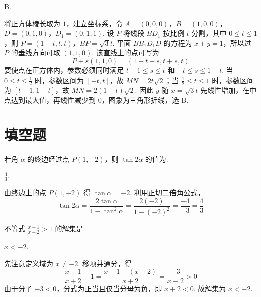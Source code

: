\begin{answer}
B.
\end{answer}

\begin{solution}
将正方体棱长取为 \(1\)，建立坐标系，令 \(A=(0,0,0)\)，\(B=(1,0,0)\)，\(D=(0,1,0)\)，\(D_1=(0,1,1)\).
设 \(P\) 将线段 \(BD_1\) 按比例 \(t\) 分割，其中 \(0\leqslant t\leqslant1\)，则
\(P=(1-t,t,t)\)，\(BP=\sqrt3t\).
平面 \(BB_1D_1D\) 的方程为 \(x+y=1\)，所以过 \(P\) 的垂线方向可取 \((1,1,0)\). 该直线上的点可写为
\[
P+s(1,1,0)=(1-t+s,t+s,t)
\]
要使点在正方体内，参数必须同时满足 \(t-1\leqslant s\leqslant t\) 和 \(-t\leqslant s\leqslant1-t\).
当 \(0\leqslant t\leqslant\frac12\) 时，参数区间为 \([-t,t]\)，故
\(MN=2t\sqrt2\)；当 \(\frac12\leqslant t\leqslant1\) 时，参数区间为 \([t-1,1-t]\)，故
\(MN=2(1-t)\sqrt2\). 因此 \(y\) 随 \(x=\sqrt3t\) 先线性增加，在中点达到最大值，再线性减少到 \(0\)，图象为三角形折线，选 B.
\end{solution}

\section{填空题}

\begin{problem}
若角 \(\alpha\) 的终边经过点 \(P(1, -2)\)，则 \(\tan 2\alpha\) 的值为\fillinblank{}.
\end{problem}

\begin{answer}
\(\frac{4}{3}\).
\end{answer}

\begin{solution}
由终边上的点 \(P(1,-2)\) 得 \(\tan\alpha=-2\). 利用正切二倍角公式，
\[
\tan2\alpha=\frac{2\tan\alpha}{1-\tan^2\alpha}
 =\frac{2(-2)}{1-(-2)^2}=\frac{-4}{-3}=\frac43
\]
\end{solution}

\begin{problem}
不等式 \(\frac{x - 1}{x + 2} > 1\) 的解集是\fillinblank{}.
\end{problem}

\begin{answer}
\(x < -2\).
\end{answer}

\begin{solution}
先注意定义域为 \(x\ne-2\). 移项并通分，得
\[
\frac{x-1}{x+2}-1=\frac{x-1-(x+2)}{x+2}=\frac{-3}{x+2}>0
\]
由于分子 \(-3<0\)，分式为正当且仅当分母为负，即 \(x+2<0\). 故解集为
\(x<-2\).
\end{solution}

